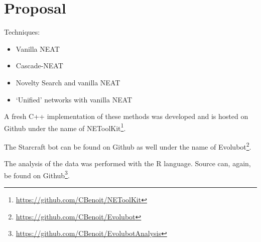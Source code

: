 \section{Proposal}\label{section:proposal}

Techniques:
\begin{itemize}
    \item Vanilla NEAT
    \item Cascade-NEAT
    \item Novelty Search and vanilla NEAT
    \item `Unified' networks with vanilla NEAT
\end{itemize}

A fresh C++ implementation of these methods was developed and is hosted on Github under the name of NEToolKit\footnote{\url{https://github.com/CBenoit/NEToolKit}}.

The Starcraft bot can be found on Github as well under the name of Evolubot\footnote{\url{https://github.com/CBenoit/Evolubot}}.

The analysis of the data was performed with the R language. Source can, again, be found on Github\footnote{\url{https://github.com/CBenoit/EvolubotAnalysis}}.

